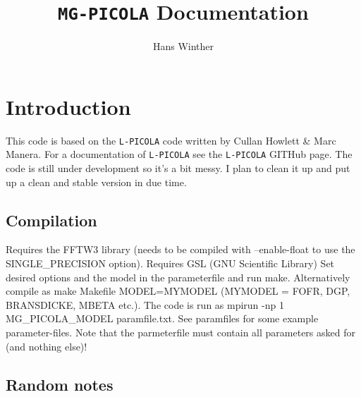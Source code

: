\documentclass[usenatbib]{article}
\title{\texttt{MG-PICOLA} Documentation}
\author{Hans Winther}
\begin{document}
\maketitle

\section*{Introduction}

This code is based on the \texttt{L-PICOLA} code written by Cullan Howlett \& Marc Manera. For a documentation of \texttt{L-PICOLA} see the \texttt{L-PICOLA} GITHub page. The code is still under development so it's a bit messy. I plan to clean it up and put up a clean and stable version in due time.

\subsection*{Compilation}
Requires the FFTW3 library (needs to be compiled with --enable-float to use the SINGLE\_PRECISION option).
\newline
\newline
Requires GSL (GNU Scientific Library)
\newline
\newline
Set desired options and the model in the parameterfile and run make. Alternatively compile as make Makefile MODEL=MYMODEL (MYMODEL = FOFR, DGP, BRANSDICKE, MBETA etc.). The code is run as mpirun -np 1 MG\_PICOLA\_MODEL paramfile.txt. See paramfiles for some example parameter-files. Note that the parmeterfile must contain all parameters asked for (and nothing else)!

\subsection*{Random notes}
\end{document}
